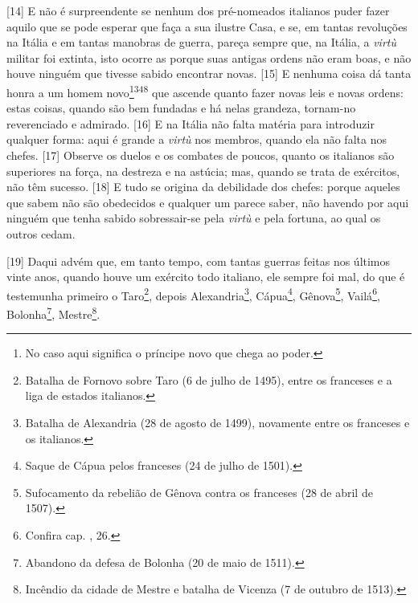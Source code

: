 {[}14{]} E não é surpreendente se nenhum dos pré-nomeados italianos
puder fazer aquilo que se pode esperar que faça a sua ilustre Casa, e
se, em tantas revoluções na Itália e em tantas manobras de guerra,
pareça sempre que, na Itália, a \emph{virtù} militar foi extinta, isto
ocorre as porque suas antigas ordens não eram boas, e não houve ninguém
que tivesse sabido encontrar novas. {[}15{]} E nenhuma coisa dá tanta
honra a um homem novo\footnote{No caso aqui significa o príncipe novo
  que chega ao poder.}\textsuperscript{348} que ascende quanto fazer
novas leis e novas ordens: estas coisas, quando são bem fundadas e há
nelas grandeza, tornam-no reverenciado e admirado. {[}16{]} E na Itália
não falta matéria para introduzir qualquer forma: aqui é grande a
\emph{virtù} nos membros, quando ela não falta nos chefes. {[}17{]}
Observe os duelos e os combates de poucos, quanto os italianos são
superiores na força, na destreza e na astúcia; mas, quando se trata de
exércitos, não têm sucesso. {[}18{]} E tudo se origina da debilidade dos
chefes: porque aqueles que sabem não são obedecidos e qualquer um parece
saber, não havendo por aqui ninguém que tenha sabido sobressair-se pela
\emph{virtù} e pela fortuna, ao qual os outros cedam.

{[}19{]} Daqui advém que, em tanto tempo, com tantas guerras feitas nos
últimos vinte anos, quando houve um exército todo italiano, ele sempre
foi mal, do que é testemunha primeiro o Taro\footnote{Batalha de Fornovo
  sobre Taro (6 de julho de 1495), entre os franceses e a liga de
  estados italianos.}, depois Alexandria\footnote{Batalha de Alexandria
  (28 de agosto de 1499), novamente entre os franceses e os italianos.},
Cápua\footnote{Saque de Cápua pelos franceses (24 de julho de 1501).},
Gênova\footnote{Sufocamento da rebelião de Gênova contra os franceses
  (28 de abril de 1507).}, Vailá\footnote{Confira cap. , 26.},
Bolonha\footnote{Abandono da defesa de Bolonha (20 de maio de 1511).},
Mestre\footnote{Incêndio da cidade de Mestre e batalha de Vicenza (7 de
  outubro de 1513).}.

